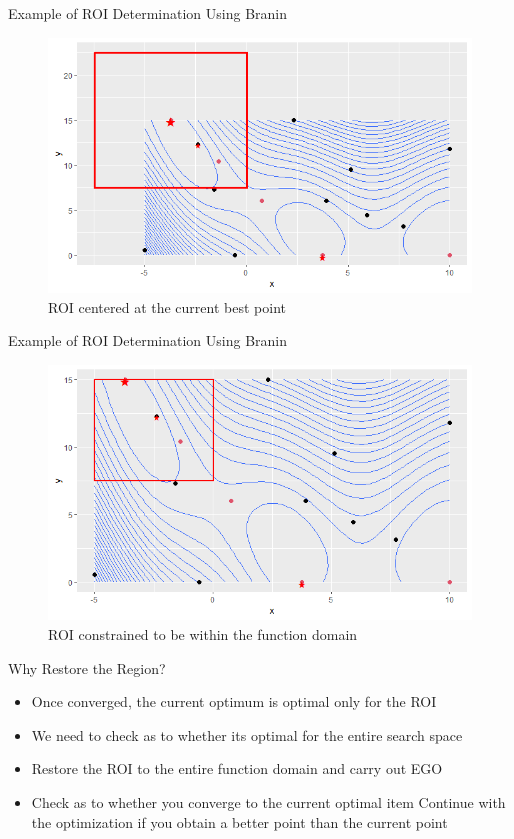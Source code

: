\documentclass{beamer}
\begin{document}
\begin{frame}{Example of ROI Determination Using Branin}
    \begin{figure}
        \centering
        \includegraphics[scale=.5]{images/branin/R4.png}
        \caption{ROI centered at the current best point}
        \label{fig:branin4}
    \end{figure}
\end{frame}
\begin{frame}{Example of ROI Determination Using Branin}
    \begin{figure}
        \centering
        \includegraphics[scale=.5]{images/branin/R5.png}
        \caption{ROI constrained to be within the function domain}
        \label{fig:branin5}
    \end{figure}
\end{frame}
\begin{frame}{Why Restore the Region?}
    \begin{itemize}
        \item Once converged, the current optimum is optimal only for the ROI
        \item We need to check as to whether its optimal for the entire search space
        \item Restore the ROI to the entire function domain and carry out EGO
        \item Check as to whether you converge to the current optimal
        item Continue with the optimization if you obtain a better point than the current point
    \end{itemize}
\end{frame}
\end{document}
